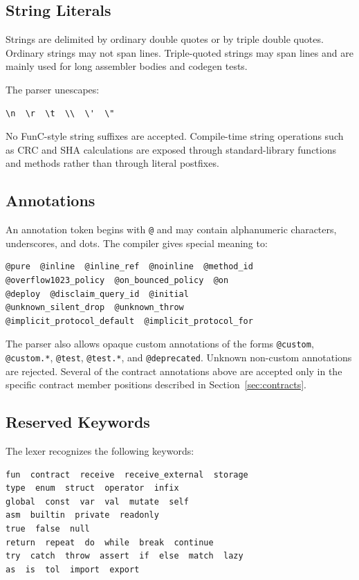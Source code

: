 \documentclass[12pt,oneside]{article}
\begin{document}
\subsection{String Literals}
Strings are delimited by ordinary double quotes or by triple double quotes.
Ordinary strings may not span lines. Triple-quoted strings may span lines and
are mainly used for long assembler bodies and codegen tests.

The parser unescapes:

\begin{verbatim}
\n  \r  \t  \\  \'  \"
\end{verbatim}

No FunC-style string suffixes are accepted. Compile-time string operations such
as CRC and SHA calculations are exposed through standard-library functions and
methods rather than through literal postfixes.

\subsection{Annotations}
An annotation token begins with \verb|@| and may contain alphanumeric
characters, underscores, and dots. The compiler gives special meaning to:

\begin{verbatim}
@pure  @inline  @inline_ref  @noinline  @method_id
@overflow1023_policy  @on_bounced_policy  @on
@deploy  @disclaim_query_id  @initial
@unknown_silent_drop  @unknown_throw
@implicit_protocol_default  @implicit_protocol_for
\end{verbatim}

The parser also allows opaque custom annotations of the forms
\verb|@custom|, \verb|@custom.*|, \verb|@test|, \verb|@test.*|, and
\verb|@deprecated|. Unknown non-custom annotations are rejected. Several of
the contract annotations above are accepted only in the specific contract
member positions described in Section~\ref{sec:contracts}.

\subsection{Reserved Keywords}
The lexer recognizes the following keywords:

\begin{verbatim}
fun  contract  receive  receive_external  storage
type  enum  struct  operator  infix
global  const  var  val  mutate  self
asm  builtin  private  readonly
true  false  null
return  repeat  do  while  break  continue
try  catch  throw  assert  if  else  match  lazy
as  is  tol  import  export
\end{verbatim}
\end{document}
